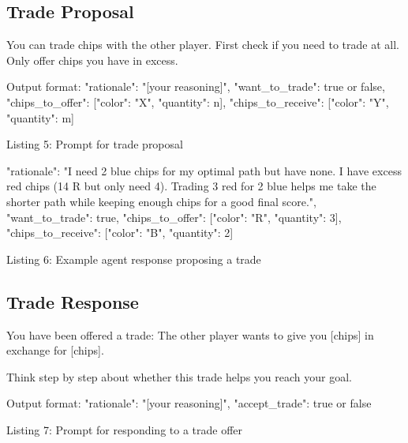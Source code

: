 \documentclass{article} %
\begin{document}
\subsection{Trade Proposal}

\begin{promptbox}

You can trade chips with the other player. First check if you need to trade at all. Only offer chips you have in excess.

Output format:
{
  "rationale": "[your reasoning]",
  "want_to_trade": true or false,
  "chips_to_offer": [{"color": "X", "quantity": n}],
  "chips_to_receive": [{"color": "Y", "quantity": m}]
}
\end{promptbox}
\vspace{-8pt}
\begin{center}\small Listing 5: Prompt for trade proposal\end{center}

\begin{promptbox}
{
  "rationale": "I need 2 blue chips for my optimal path but
  have none. I have excess red chips (14 R but only need 4).
  Trading 3 red for 2 blue helps me take the shorter path
  while keeping enough chips for a good final score.",
  "want_to_trade": true,
  "chips_to_offer": [{"color": "R", "quantity": 3}],
  "chips_to_receive": [{"color": "B", "quantity": 2}]
}
\end{promptbox}
\vspace{-8pt}
\begin{center}\small Listing 6: Example agent response proposing a trade\end{center}

\subsection{Trade Response}

\begin{promptbox}

You have been offered a trade:
The other player wants to give you [chips] in exchange for [chips].

Think step by step about whether this trade helps you reach your goal.

Output format:
{
  "rationale": "[your reasoning]",
  "accept_trade": true or false
}
\end{promptbox}
\vspace{-8pt}
\begin{center}\small Listing 7: Prompt for responding to a trade offer\end{center}
\end{document}

